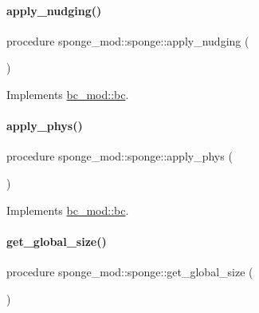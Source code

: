 \paragraph{\texorpdfstring{apply\+\_\+nudging()}{apply\_nudging()}}
{\footnotesize\ttfamily procedure sponge\+\_\+mod\+::sponge\+::apply\+\_\+nudging (\begin{DoxyParamCaption}{ }\end{DoxyParamCaption})\hspace{0.3cm}{\ttfamily [private]}}



Implements \mbox{\hyperlink{structbc__mod_1_1bc_a42dc448ba9e50fbb6b1acf03b0d121f3}{bc\+\_\+mod\+::bc}}.

\mbox{\label{structsponge__mod_1_1sponge_ab3f6fd55b37a4a4ba7fe9d0ac9f7b9ac}} 
\paragraph{\texorpdfstring{apply\+\_\+phys()}{apply\_phys()}}
{\footnotesize\ttfamily procedure sponge\+\_\+mod\+::sponge\+::apply\+\_\+phys (\begin{DoxyParamCaption}{ }\end{DoxyParamCaption})\hspace{0.3cm}{\ttfamily [private]}}



Implements \mbox{\hyperlink{structbc__mod_1_1bc_ad0d03ece320569369a296ff3d4cf10d2}{bc\+\_\+mod\+::bc}}.

\mbox{\label{structsponge__mod_1_1sponge_a6e25af9d9685756eca68b255dcbefde4}} 
\paragraph{\texorpdfstring{get\+\_\+global\+\_\+size()}{get\_global\_size()}}
{\footnotesize\ttfamily procedure sponge\+\_\+mod\+::sponge\+::get\+\_\+global\+\_\+size (\begin{DoxyParamCaption}{ }\end{DoxyParamCaption})\hspace{0.3cm}{\ttfamily [private]}}

